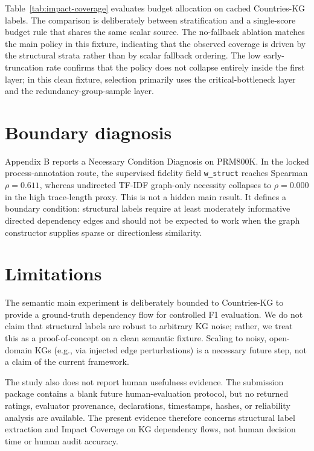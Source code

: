 \documentclass[pdflatex,sn-mathphys-num]{sn-jnl}
\begin{document}
Table~\ref{tab:impact-coverage} evaluates budget allocation on cached Countries-KG labels. The comparison is deliberately between stratification and a single-score budget rule that shares the same scalar source. The no-fallback ablation matches the main policy in this fixture, indicating that the observed coverage is driven by the structural strata rather than by scalar fallback ordering. The low early-truncation rate confirms that the policy does not collapse entirely inside the first layer; in this clean fixture, selection primarily uses the critical-bottleneck layer and the redundancy-group-sample layer.

\section{Boundary diagnosis}\label{sec:boundary}

Appendix B reports a Necessary Condition Diagnosis on PRM800K. In the locked process-annotation route, the supervised fidelity field \texttt{w\_struct} reaches Spearman $\rho=0.611$, whereas undirected TF-IDF graph-only necessity collapses to $\rho=0.000$ in the high trace-length proxy. This is not a hidden main result. It defines a boundary condition: structural labels require at least moderately informative directed dependency edges and should not be expected to work when the graph constructor supplies sparse or directionless similarity.

\section{Limitations}\label{sec:limitations}

The semantic main experiment is deliberately bounded to Countries-KG to provide a ground-truth dependency flow for controlled F1 evaluation. We do not claim that structural labels are robust to arbitrary KG noise; rather, we treat this as a proof-of-concept on a clean semantic fixture. Scaling to noisy, open-domain KGs (e.g., via injected edge perturbations) is a necessary future step, not a claim of the current framework.

The study also does not report human usefulness evidence. The submission package contains a blank future human-evaluation protocol, but no returned ratings, evaluator provenance, declarations, timestamps, hashes, or reliability analysis are available. The present evidence therefore concerns structural label extraction and Impact Coverage on KG dependency flows, not human decision time or human audit accuracy.
\end{document}
